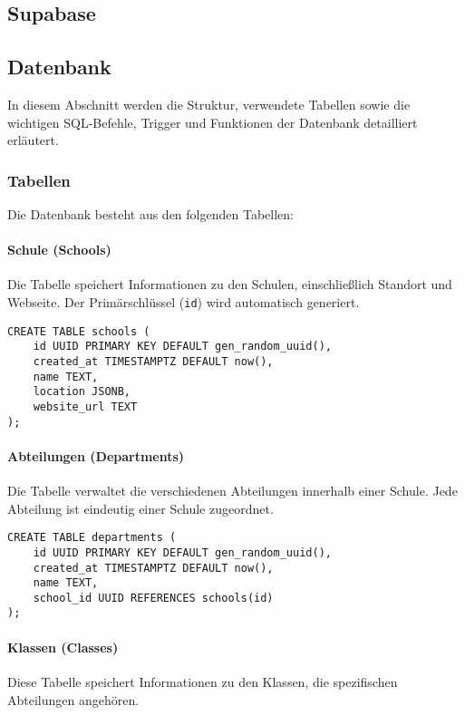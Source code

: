 \begin{inhalt}
\renewcommand*\chapterpagestyle{scrheadings}
\chapter{Supabase}

\section{Datenbank}

In diesem Abschnitt werden die Struktur, verwendete Tabellen sowie die wichtigen SQL-Befehle, Trigger und Funktionen der Datenbank detailliert erläutert.


\subsection{Tabellen}

Die Datenbank besteht aus den folgenden Tabellen:

\subsubsection{Schule (Schools)}
Die Tabelle speichert Informationen zu den Schulen, einschließlich Standort und Webseite. Der Primärschlüssel (\texttt{id}) wird automatisch generiert.

\begin{lstlisting}[style=mysql]
CREATE TABLE schools (
    id UUID PRIMARY KEY DEFAULT gen_random_uuid(),
    created_at TIMESTAMPTZ DEFAULT now(),
    name TEXT,
    location JSONB,
    website_url TEXT
);
\end{lstlisting}

\subsubsection{Abteilungen (Departments)}
Die Tabelle verwaltet die verschiedenen Abteilungen innerhalb einer Schule. Jede Abteilung ist eindeutig einer Schule zugeordnet.

\begin{lstlisting}[style=mysql]
CREATE TABLE departments (
    id UUID PRIMARY KEY DEFAULT gen_random_uuid(),
    created_at TIMESTAMPTZ DEFAULT now(),
    name TEXT,
    school_id UUID REFERENCES schools(id)
);
\end{lstlisting}

\subsubsection{Klassen (Classes)}
Diese Tabelle speichert Informationen zu den Klassen, die spezifischen Abteilungen angehören.


\end{inhalt}
